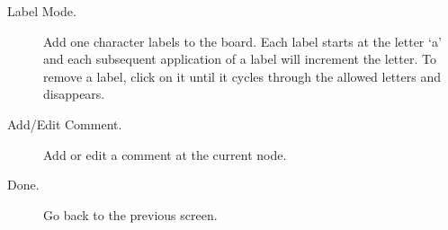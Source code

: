 \begin {description}
\begin{description}
        \item[Label Mode.] Add one character labels to the board. Each label
            starts at the letter `a' and each subsequent application of a label
            will increment the letter.  To remove a label, click on it until it
            cycles through the allowed letters and disappears.
        \item[Add/Edit Comment.] Add or edit a comment at the current node.
        \item[Done.] Go back to the previous screen.
    \end{description}
\end{description}

